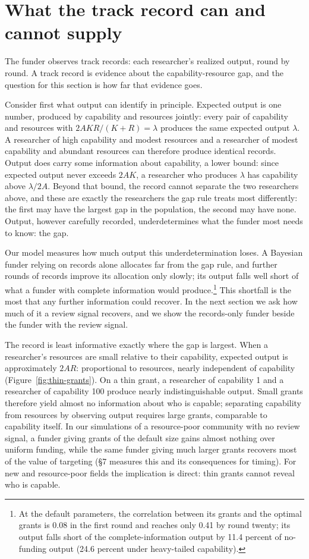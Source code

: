 \documentclass[article, 11pt, reqno]{amsart}
\theoremstyle{named}
\begin{document}
\section{What the track record can and cannot supply}\label{sec:records}

The funder observes track records: each researcher's realized output, round by round. A track record is evidence about the capability-resource gap, and the question for this section is how far that evidence goes.

Consider first what output can identify in principle. Expected output is one number, produced by capability and resources jointly: every pair of capability and resources with $2AKR/(K+R) = \lambda$ produces the same expected output $\lambda$. A researcher of high capability and modest resources and a researcher of modest capability and abundant resources can therefore produce identical records. Output does carry some information about capability, a lower bound: since expected output never exceeds $2AK$, a researcher who produces $\lambda$ has capability above $\lambda/2A$. Beyond that bound, the record cannot separate the two researchers above, and these are exactly the researchers the gap rule treats most differently: the first may have the largest gap in the population, the second may have none. Output, however carefully recorded, underdetermines what the funder most needs to know: the gap.

Our model measures how much output this underdetermination loses. A Bayesian funder relying on records alone allocates far from the gap rule, and further rounds of records improve its allocation only slowly; its output falls well short of what a funder with complete information would produce.\footnote{At the default parameters, the correlation between its grants and the optimal grants is 0.08 in the first round and reaches only 0.41 by round twenty; its output falls short of the complete-information output by 11.4 percent of no-funding output (24.6 percent under heavy-tailed capability).} This shortfall is the most that any further information could recover. In the next section we ask how much of it a review signal recovers, and we show the records-only funder beside the funder with the review signal.

The record is least informative exactly where the gap is largest. When a researcher's resources are small relative to their capability, expected output is approximately $2AR$: proportional to resources, nearly independent of capability (Figure~\ref{fig:thin-grants}). On a thin grant, a researcher of capability 1 and a researcher of capability 100 produce nearly indistinguishable output. Small grants therefore yield almost no information about who is capable; separating capability from resources by observing output requires large grants, comparable to capability itself. In our simulations of a resource-poor community with no review signal, a funder giving grants of the default size gains almost nothing over uniform funding, while the same funder giving much larger grants recovers most of the value of targeting (\S7 measures this and its consequences for timing). For new and resource-poor fields the implication is direct: thin grants cannot reveal who is capable.
\end{document}
